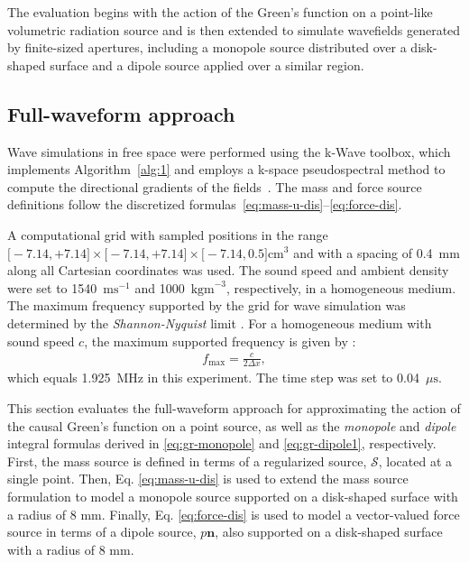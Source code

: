 \documentclass[11pt,reqno]{amsart}
\theoremstyle{remark}
\theoremstyle{italic_lemma}
\newcommand{\bn}{\boldsymbol{n}}
\begin{document}
The evaluation begins with the action of the Green's function on a point-like volumetric radiation source and is then extended to simulate wavefields generated by finite-sized apertures, including a monopole source distributed over a disk-shaped surface and a dipole source applied over a similar region.



\subsection*{Full-waveform approach}
Wave simulations in free space were performed using the k-Wave toolbox, which implements Algorithm~\ref{alg:1} and employs a k-space pseudospectral method to compute the directional gradients of the fields~\cite{Treeby}. 
The mass and force source definitions follow the discretized formulas~\eqref{eq:mass-u-dis}--\eqref{eq:force-dis}.

A computational grid with sampled positions in the range $\big[-7.14, +7.14 \big] \times \big[-7.14, +7.14 \big] \times \big[-7.14, 0.5 \big] \text{cm}^3$ and with a spacing of 0.4~mm along all Cartesian coordinates was used. The sound speed and ambient density were set to 1540~$\text{ms}^{-1}$ and 1000~$ \text{kgm}^{-3}$, respectively, in a homogeneous medium. The maximum frequency supported by the grid for wave simulation was determined by the \textit{Shannon-Nyquist} limit \cite{Tabei}. For a homogeneous medium with sound speed $c$, the maximum supported frequency is given by \cite{Treeby}:
\begin{align} \label{eq:fmax}
    f_\text{max}= \frac{c}{2 \Delta x},
\end{align}
which equals 1.925~MHz in this experiment. The time step was set to 0.04~$ \mu \text{s}$. 

This section evaluates the full-waveform approach for approximating the action of the causal Green's function on a point source, as well as the \textit{monopole} and \textit{dipole} integral formulas derived in \eqref{eq:gr-monopole} and \eqref{eq:gr-dipole1}, respectively. First, the mass source is defined in terms of a regularized source, $\mathcal{S}$, located at a single point. Then, Eq. \eqref{eq:mass-u-dis} is used to extend the mass source formulation to model a monopole source supported on a disk-shaped surface with a radius of $8$ mm. Finally, Eq. \eqref{eq:force-dis} is used to model a vector-valued force source in terms of a dipole source, $p \bn$, also supported on a disk-shaped surface with a radius of $8$ mm. 
\end{document}

